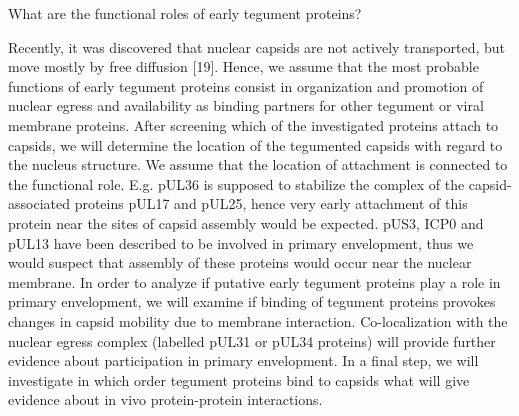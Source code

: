 What are the functional roles of early tegument proteins?

Recently, it was discovered that nuclear capsids are not actively transported, but move mostly by free diffusion [19].
Hence, we assume that the most probable functions of early tegument proteins consist in organization and promotion of nuclear egress and availability as binding partners for other tegument or viral membrane proteins.
After screening which of the investigated proteins attach to capsids, we will determine the location of the tegumented capsids with regard to the nucleus structure.
We assume that the location of attachment is connected to the functional role.
E.g. pUL36 is supposed to stabilize the complex of the capsid-associated proteins pUL17 and pUL25, hence very early attachment of this protein near the sites of capsid assembly would be expected.
pUS3, ICP0 and pUL13 have been described to be involved in primary envelopment, thus we would suspect that assembly of these proteins would occur near the nuclear membrane.
In order to analyze if putative early tegument proteins play a role in primary envelopment, we will examine if binding of tegument proteins provokes changes in capsid mobility due to membrane interaction.
Co-localization with the nuclear egress complex (labelled pUL31 or pUL34 proteins) will provide further evidence about participation in primary envelopment.
In a final step, we will investigate in which order tegument proteins bind to capsids what will give evidence about in vivo protein-protein interactions.
